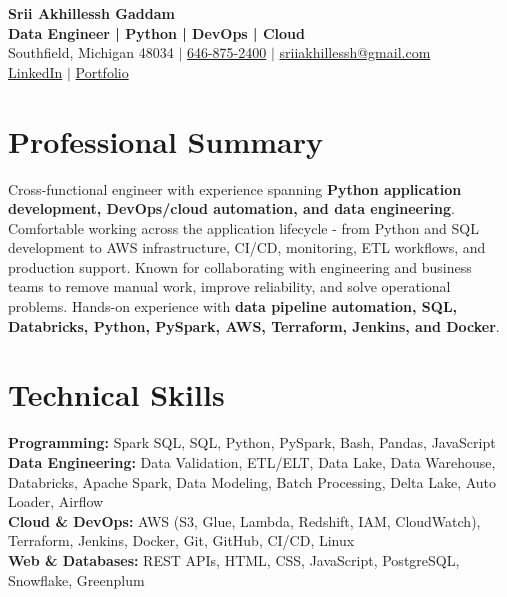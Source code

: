 \documentclass[letterpaper,10pt]{article}
\begin{document}
\fontsize{9.35pt}{10.45pt}\selectfont

\begin{center}
    {\LARGE \textbf{Srii Akhillessh Gaddam}} \\[-1pt]
    \textbf{Data Engineer | Python | DevOps | Cloud} \\[2pt]
    Southfield, Michigan 48034 $|$
    \href{tel:6468752400}{646-875-2400} $|$
    \href{mailto:sriiakhillessh@gmail.com}{sriiakhillessh@gmail.com} \\[1pt]
    \href{https://www.linkedin.com/in/srii-akhiilessh-gaddam-b48668191/}{LinkedIn} $|$
    \href{https://sriiakhillesshg.github.io/portfolio/}{Portfolio}
\end{center}
\vspace{-8pt}

\section{Professional Summary}
\small{Cross-functional engineer with experience spanning \textbf{Python application development, DevOps/cloud automation, and data engineering}. Comfortable working across the application lifecycle - from Python and SQL development to AWS infrastructure, CI/CD, monitoring, ETL workflows, and production support. Known for collaborating with engineering and business teams to remove manual work, improve reliability, and solve operational problems. Hands-on experience with \textbf{data pipeline automation, SQL, Databricks, Python, PySpark, AWS, Terraform, Jenkins, and Docker}.}

\section{Technical Skills}
\small{
\textbf{Programming:} Spark SQL, SQL, Python, PySpark, Bash, Pandas, JavaScript \\
\textbf{Data Engineering:} Data Validation, ETL/ELT, Data Lake, Data Warehouse, Databricks, Apache Spark, Data Modeling, Batch Processing, Delta Lake, Auto Loader, Airflow \\
\textbf{Cloud \& DevOps:} AWS (S3, Glue, Lambda, Redshift, IAM, CloudWatch), Terraform, Jenkins, Docker, Git, GitHub, CI/CD, Linux \\
\textbf{Web \& Databases:} REST APIs, HTML, CSS, JavaScript, PostgreSQL, Snowflake, Greenplum
}
\end{document}
